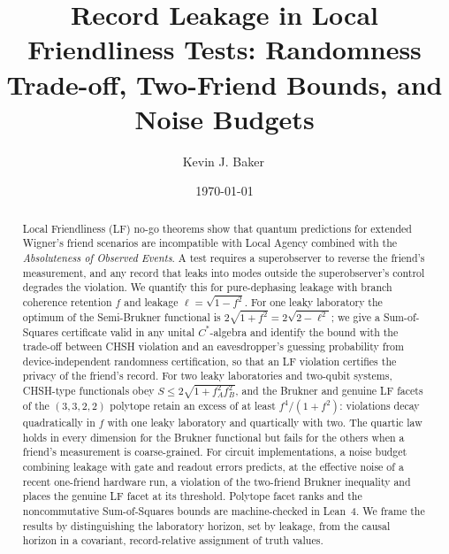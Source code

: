 \documentclass[aps,pra,reprint,nofootinbib,amsmath,amssymb]{revtex4-2}
\theoremstyle{plain}
\theoremstyle{definition}
\begin{document}
\title{Record Leakage in Local Friendliness Tests: Randomness Trade-off, Two-Friend Bounds, and Noise Budgets}

\author{Kevin J. Baker\,}

\date{\today}

\begin{abstract}
Local Friendliness (LF) no-go theorems show that quantum predictions for extended Wigner's friend scenarios are incompatible with Local Agency combined with the \emph{Absoluteness of Observed Events}. A test requires a superobserver to reverse the friend's measurement, and any record that leaks into modes outside the superobserver's control degrades the violation. We quantify this for pure-dephasing leakage with branch coherence retention $f$ and leakage $\ell = \sqrt{1 - f^2}$. For one leaky laboratory the optimum of the Semi-Brukner functional is $2\sqrt{1 + f^2} = 2\sqrt{2 - \ell^2}$; we give a Sum-of-Squares certificate valid in any unital $C^*$-algebra and identify the bound with the trade-off between CHSH violation and an eavesdropper's guessing probability from device-independent randomness certification, so that an LF violation certifies the privacy of the friend's record. For two leaky laboratories and two-qubit systems, CHSH-type functionals obey $S \le 2\sqrt{1 + f_A^2 f_B^2}$, and the Brukner and genuine LF facets of the $(3,3,2,2)$ polytope retain an excess of at least $f^4/(1+f^2)$: violations decay quadratically in $f$ with one leaky laboratory and quartically with two. The quartic law holds in every dimension for the Brukner functional but fails for the others when a friend's measurement is coarse-grained. For circuit implementations, a noise budget combining leakage with gate and readout errors predicts, at the effective noise of a recent one-friend hardware run, a violation of the two-friend Brukner inequality and places the genuine LF facet at its threshold. Polytope facet ranks and the noncommutative Sum-of-Squares bounds are machine-checked in Lean~4. We frame the results by distinguishing the laboratory horizon, set by leakage, from the causal horizon in a covariant, record-relative assignment of truth values.
\end{abstract}

\maketitle








\end{document}

